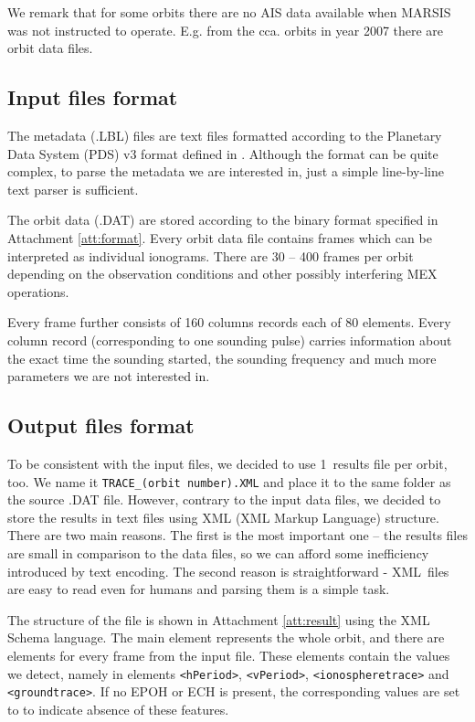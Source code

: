 We remark that for some orbits there are no AIS data available when MARSIS was not instructed to operate. E.g. from the cca.  orbits in year 2007 there are  orbit data files.

\subsection{Input files format}
The metadata (.LBL) files are text files formatted according to the Planetary Data System (PDS) v3 format defined in \citep{JPL2009}. Although the format can be quite complex, to parse the metadata we are interested in, just a simple line-by-line text parser is sufficient.

The orbit data (.DAT) are stored according to the binary format specified in Attachment \ref{att:format}. Every orbit data file contains frames which can be interpreted as individual ionograms. There are 30 -- 400 frames per orbit depending on the observation conditions and other possibly interfering MEX operations. 

Every frame further consists of 160 columns records each of 80 elements. Every column record (corresponding to one sounding pulse) carries information about the exact time the sounding started, the sounding frequency and much more parameters we are not interested in.

\subsection{Output files format}
To be consistent with the input files, we decided to use 1~results file per orbit, too. We name it \texttt{TRACE\_(orbit number).XML} and place it to the same folder as the source .DAT file. However, contrary to the input data files, we decided to store the results in text files using XML (XML Markup Language) structure. There are two main reasons. The first is the most important one -- the results files are small in comparison to the data files, so we can afford some inefficiency introduced by text encoding. The second reason is straightforward - XML~files are easy to read even for humans and parsing them is a simple task.

The structure of the file is shown in Attachment \ref{att:result} using the XML Schema language. The main element represents the whole orbit, and there are elements for every frame from the input file. These elements contain the values we detect, namely in elements \texttt{<hPeriod>}, \texttt{<vPeriod>}, \texttt{<ionospheretrace>} and \texttt{<groundtrace>}. If no EPOH or ECH is present, the corresponding values are set to  to indicate absence of these features.

